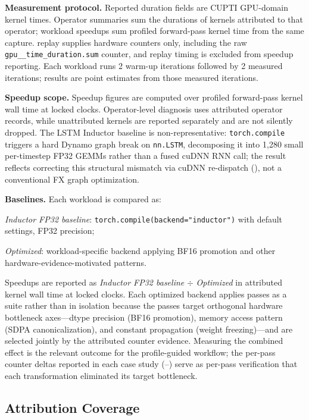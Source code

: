 \textbf{Measurement protocol.}  Reported duration fields are \nsys CUPTI GPU-domain
kernel times.  Operator summaries sum the \nsys durations of kernels attributed to that
operator; workload speedups sum profiled forward-pass kernel time from the same capture.
\ncu replay supplies hardware counters only, including the raw
\texttt{gpu\_\_time\_duration.sum} counter, and replay timing is excluded from speedup
reporting.  Each workload runs 2 warm-up iterations followed by 2 measured iterations;
results are point estimates from those measured iterations.

\textbf{Speedup scope.}  Speedup figures are computed over profiled forward-pass
kernel wall time at locked clocks.  Operator-level diagnosis uses attributed operator
records, while unattributed kernels are reported separately and are not silently dropped.
The LSTM Inductor baseline is non-representative: \texttt{torch.compile} triggers a hard
Dynamo graph break on \texttt{nn.LSTM}, decomposing it into 1{,}280 small per-timestep FP32
GEMMs rather than a fused cuDNN RNN call; the result reflects correcting this structural
mismatch via cuDNN re-dispatch (), not a conventional FX graph
optimization.

\textbf{Baselines.}  Each workload is compared as:
\begin{enumerate*}[label=(\arabic*)]
  \item \emph{Inductor FP32 baseline}: \texttt{torch.compile(\allowbreak backend="inductor")} with
    default settings, FP32 precision;
  \item \emph{Optimized}: workload-specific backend applying BF16 promotion and other
    hardware-evidence-motivated patterns.
\end{enumerate*}
Speedups are reported as \emph{Inductor FP32 baseline} $\div$ \emph{Optimized} in attributed
kernel wall time at locked clocks.
Each optimized backend applies passes as a suite rather than in isolation because the
passes target orthogonal hardware bottleneck axes---dtype precision (BF16 promotion),
memory access pattern (SDPA canonicalization), and constant propagation (weight
freezing)---and are selected jointly by the attributed counter evidence.
Measuring the combined effect is the relevant outcome for the profile-guided workflow;
the per-pass counter deltas reported in each case study (--)
serve as per-pass verification that each transformation eliminated its target bottleneck.

\subsection{Attribution Coverage}
\label{sec:coverage}

